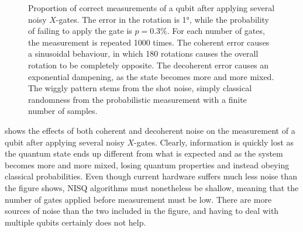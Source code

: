 \begin{figure}
  \centering
  \caption[
    Effect of noise on the likelihood of a correct measurement.
  ]
  {
    Proportion of correct measurements of a qubit after applying several noisy $X$-gates.
    The error in the rotation is \ang{1}, while the probability of failing to apply the gate is $p=0.3\%$.
    For each number of gates, the measurement is repeated 1000 times.
    The coherent error causes a sinusoidal behaviour, in which 180 rotations causes the overall rotation to be completely opposite.
    The decoherent error causes an exponential dampening, as the state becomes more and more mixed.
    The wiggly pattern stems from the shot noise, simply classical randomness from the probabilistic measurement with a finite number of samples.
  }
  \label{fig:noise_graph}
\end{figure}

 shows the effects of both coherent and decoherent noise on the measurement of a qubit after applying several noisy $X$-gates.
Clearly, information is quickly lost as the quantum state ends up different from what is expected and as the system becomes more and more mixed, losing quantum properties and instead obeying classical probabilities.
Even though current hardware suffers much less noise than the figure shows, NISQ algorithms must nonetheless be shallow, meaning that the number of gates applied before measurement must be low.
There are more sources of noise than the two included in the figure, and having to deal with multiple qubits certainly does not help.

